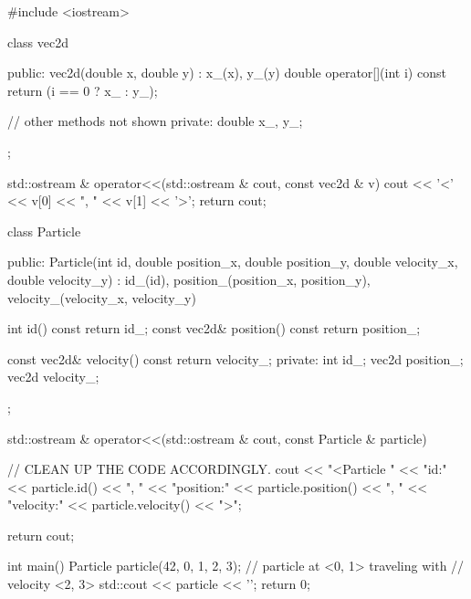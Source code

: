 \begin{answercode}
#include <iostream>

  class vec2d
  {
    public:
    vec2d(double x, double y)
    : x_(x), y_(y)
    {}
    double operator[](int i) const
    {
      return (i == 0 ? x_ : y_);
    }

    // other methods not shown
    private:
    double x_, y_;
  };

  std::ostream & operator<<(std::ostream & cout, const vec2d & v)
  {
    cout << '<' << v[0] << ", " << v[1] << '>';
    return cout;
  }

  class Particle
  {
    public:
    Particle(int id, double position_x, double position_y,
    double velocity_x, double velocity_y)
    : id_(id), position_(position_x, position_y),
    velocity_(velocity_x, velocity_y)
    {}

    int id() const
    {
      return id_;
    }
    const vec2d& position() const
    {
      return position_;
    }

    const vec2d& velocity() const
    {
      return velocity_;
    }
    private:
    int id_;
    vec2d position_;
    vec2d velocity_;
  };

  std::ostream & operator<<(std::ostream & cout, const Particle & particle)
  {
    // CLEAN UP THE CODE ACCORDINGLY.
    cout << "<Particle "
    << "id:" << particle.id() << ", "
    << "position:" << particle.position() << ", "
    << "velocity:" << particle.velocity() << ">";
    
    return cout;
  }

  int main()
  {
    Particle particle(42, 0, 1, 2, 3); // particle at <0, 1> traveling with
    // velocity <2, 3>
    std::cout << particle << '\n';
    return 0;
  }
\end{answercode}


